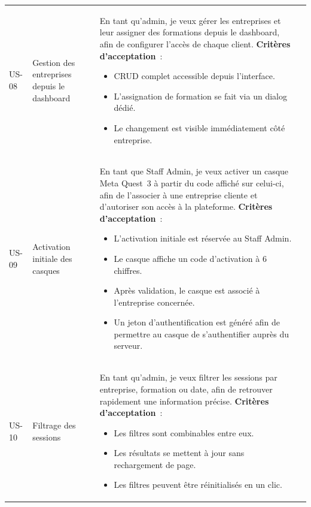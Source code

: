 \begin{longtable}{lp{2.8cm}p{8cm}l}
  US-08 & Gestion des entreprises depuis le dashboard &
    En tant qu'admin, je veux gérer les entreprises et leur assigner
    des formations depuis le dashboard, afin de configurer l'accès de
    chaque client.
    \newline\textbf{Critères d'acceptation}~:
    \begin{itemize}
      \item CRUD complet accessible depuis l'interface.
      \item L'assignation de formation se fait via un dialog dédié.
      \item Le changement est visible immédiatement côté entreprise.
    \end{itemize}
    & \must{} \\[4pt]

  US-09 & Activation initiale des casques &

  En tant que Staff Admin, je veux activer un casque Meta Quest~3 
  à partir du code affiché sur celui-ci, afin de l'associer à une
  entreprise cliente et d'autoriser son accès à la plateforme.
  \newline\textbf{Critères d'acceptation}~:
  \begin{itemize}

    \item L'activation initiale est réservée au Staff Admin.

    \item Le casque affiche un code d'activation à 6 chiffres.

    \item Après validation, le casque est associé à l'entreprise concernée.

    \item Un jeton d'authentification est généré afin de permettre
    au casque de s'authentifier auprès du serveur.

  \end{itemize}
  & \must{} \\[4pt]

  US-10 & Filtrage des sessions &
    En tant qu'admin, je veux filtrer les sessions par entreprise,
    formation ou date, afin de retrouver rapidement une information
    précise.
    \newline\textbf{Critères d'acceptation}~:
    \begin{itemize}
      \item Les filtres sont combinables entre eux.
      \item Les résultats se mettent à jour sans rechargement de page.
      \item Les filtres peuvent être réinitialisés en un clic.
    \end{itemize}
    & \should{} \\[4pt]


\end{longtable}

